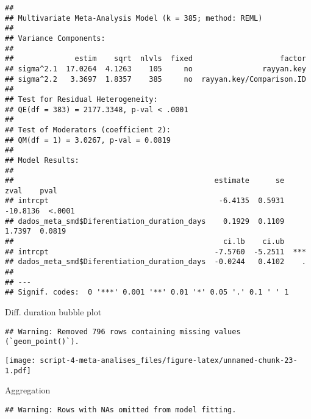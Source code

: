 \documentclass[
]{article}
\begin{document}
\begin{verbatim}
## 
## Multivariate Meta-Analysis Model (k = 385; method: REML)
## 
## Variance Components:
## 
##              estim    sqrt  nlvls  fixed                    factor 
## sigma^2.1  17.0264  4.1263    105     no                rayyan.key 
## sigma^2.2   3.3697  1.8357    385     no  rayyan.key/Comparison.ID 
## 
## Test for Residual Heterogeneity:
## QE(df = 383) = 2177.3348, p-val < .0001
## 
## Test of Moderators (coefficient 2):
## QM(df = 1) = 3.0267, p-val = 0.0819
## 
## Model Results:
## 
##                                              estimate      se      zval    pval 
## intrcpt                                       -6.4135  0.5931  -10.8136  <.0001 
## dados_meta_smd$Diferentiation_duration_days    0.1929  0.1109    1.7397  0.0819 
##                                                ci.lb    ci.ub      
## intrcpt                                      -7.5760  -5.2511  *** 
## dados_meta_smd$Diferentiation_duration_days  -0.0244   0.4102    . 
## 
## ---
## Signif. codes:  0 '***' 0.001 '**' 0.01 '*' 0.05 '.' 0.1 ' ' 1
\end{verbatim}

Diff. duration bubble plot

\begin{verbatim}
## Warning: Removed 796 rows containing missing values (`geom_point()`).
\end{verbatim}

\texttt{[image: script-4-meta-analises\_files/figure-latex/unnamed-chunk-23-1.pdf]}

Aggregation

\begin{verbatim}
## Warning: Rows with NAs omitted from model fitting.
\end{verbatim}
\end{document}
